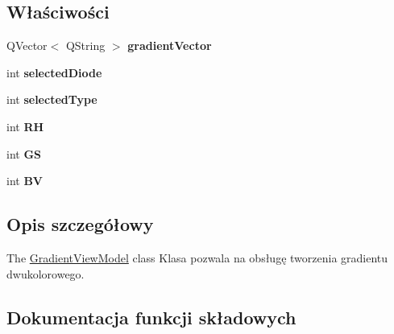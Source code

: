 \subsection*{Właściwości}
\begin{DoxyCompactItemize}
\item 
\mbox{\label{class_gradient_view_model_a53c45ee55828896e8da5541aee55f010}} 
Q\+Vector$<$ Q\+String $>$ {\bfseries gradient\+Vector}
\item 
\mbox{\label{class_gradient_view_model_a99b38588ddd7327b24edb9a1949af53e}} 
int {\bfseries selected\+Diode}
\item 
\mbox{\label{class_gradient_view_model_a8f59afe82a71f2b62e35d3f7f28c7d7a}} 
int {\bfseries selected\+Type}
\item 
\mbox{\label{class_gradient_view_model_a1f5d000e7a1a24d86b59fbbc6e10892e}} 
int {\bfseries RH}
\item 
\mbox{\label{class_gradient_view_model_acb5ce2894831c795264a7a3130b4dd52}} 
int {\bfseries GS}
\item 
\mbox{\label{class_gradient_view_model_ac7d5d88278017448e6a259308e1652f5}} 
int {\bfseries BV}
\end{DoxyCompactItemize}


\subsection{Opis szczegółowy}
The \mbox{\hyperlink{class_gradient_view_model}{Gradient\+View\+Model}} class Klasa pozwala na obsługę tworzenia gradientu dwukolorowego. 

\subsection{Dokumentacja funkcji składowych}
\mbox{\label{class_gradient_view_model_affb6254ecc82d22552db80ecb959a9a0}} 
